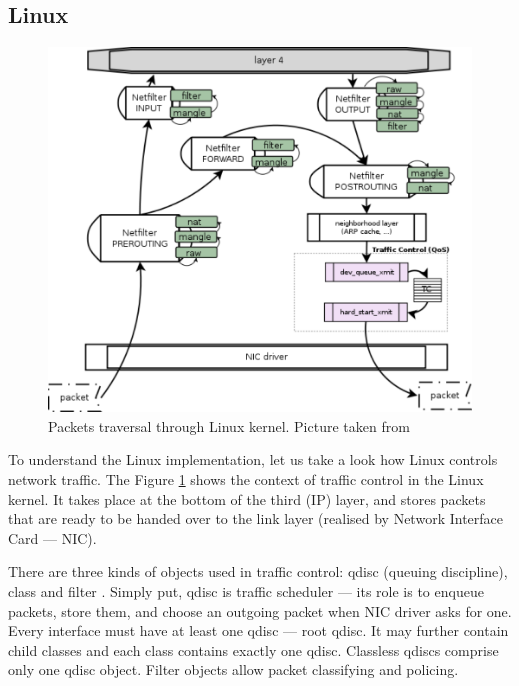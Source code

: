 \subsection {Linux}
\begin{figure}
	\centering
	\includegraphics[width=137mm]{drawings/network_stack}
	\caption{Packets traversal through Linux kernel. Picture taken from \cite{linuxCore}}
	\label{fig12:linux}
\end{figure}

To understand the Linux implementation, let us take a look how Linux controls network traffic. The Figure \ref{fig12:linux} shows the context of traffic control in the Linux kernel. It takes place at the bottom of the third (IP) layer, and stores packets that are ready to be handed over to the link layer (realised by Network Interface Card --- NIC).


There are three kinds of objects used in traffic control: qdisc (queuing discipline), class and filter \cite{tc}. Simply put, qdisc is traffic scheduler --- its role is to enqueue packets, store them, and choose an outgoing packet when NIC driver asks for one. Every interface must have at least one qdisc --- root qdisc. It may further contain child classes and each class contains exactly one qdisc. Classless qdiscs comprise only one qdisc object. Filter objects allow packet classifying and policing.

